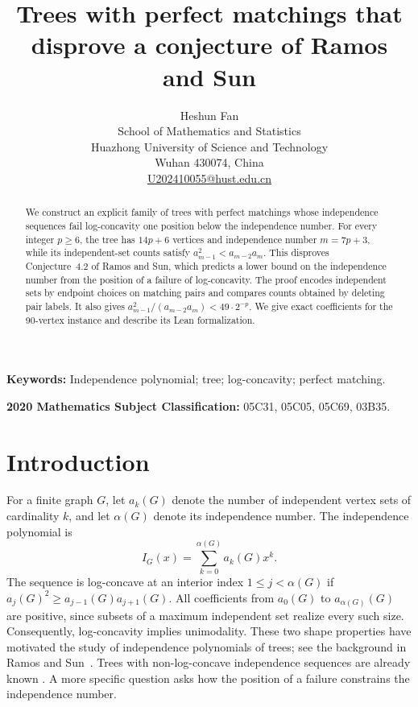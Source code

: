 \documentclass[11pt,a4paper]{article}
\title{Trees with perfect matchings that disprove a conjecture of Ramos and Sun}
\author{Heshun Fan\\
{\small School of Mathematics and Statistics}\\
{\small Huazhong University of Science and Technology}\\
{\small Wuhan 430074, China}\\
{\small \href{mailto:U202410055@hust.edu.cn}{U202410055@hust.edu.cn}}}
\date{}
\theoremstyle{remark}
\numberwithin{equation}{section}
\begin{document}
\maketitle

\begin{abstract}
We construct an explicit family of trees with perfect matchings whose
independence sequences fail log-concavity one position below the
independence number. For every integer $p\geq6$, the tree has $14p+6$
vertices and independence number $m=7p+3$, while its independent-set
counts satisfy $a_{m-1}^2<a_{m-2}a_m$. This disproves Conjecture~4.2
of Ramos and Sun, which predicts a lower bound on the independence
number from the position of a failure of log-concavity. The proof
encodes independent sets by endpoint choices on matching pairs and
compares counts obtained by deleting pair labels. It also gives
$a_{m-1}^2/(a_{m-2}a_m)<49\cdot2^{-p}$. We give exact coefficients
for the 90-vertex instance and describe its Lean formalization.
\end{abstract}

\begingroup\small
\noindent\textbf{Keywords:} Independence polynomial; tree; log-concavity; perfect matching.\par
\noindent\textbf{2020 Mathematics Subject Classification:} 05C31, 05C05, 05C69, 03B35.\par
\endgroup

\section{Introduction}\label{sec:introduction}

For a finite graph $G$, let $a_k(G)$ denote the number of independent
vertex sets of cardinality $k$, and let $\alpha(G)$ denote its
independence number. The independence polynomial is
\[
 I_G(x)=\sum_{k=0}^{\alpha(G)}a_k(G)x^k.
\]
The sequence is log-concave at an interior index
$1\leq j<\alpha(G)$ if
$a_j(G)^2\geq a_{j-1}(G)a_{j+1}(G)$.
All coefficients from $a_0(G)$ to $a_{\alpha(G)}(G)$ are positive,
since subsets of a maximum independent set realize every such size.
Consequently, log-concavity implies unimodality. These two shape
properties have motivated the study of independence polynomials of
trees; see the background in Ramos and Sun~\cite[Section~2.1]{RamosSun2025}.
Trees with non-log-concave independence sequences are already known
\cite{KadrawiLevit2023}. A more specific question asks how the position
of a failure constrains the independence number.
\end{document}
